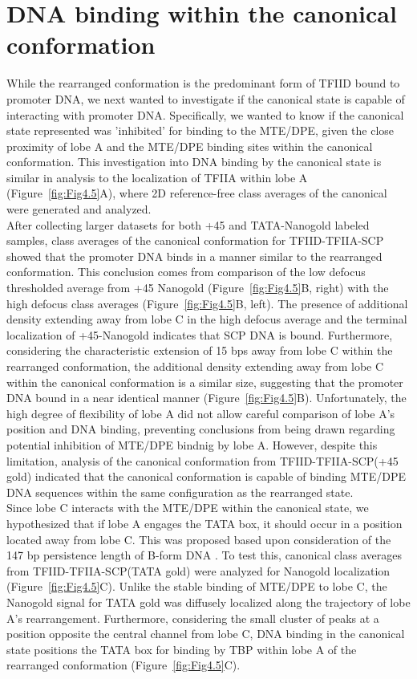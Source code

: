 \section{DNA binding within the canonical conformation}

While the rearranged conformation is the predominant form of TFIID bound to promoter DNA, we next wanted to investigate if the canonical state is capable of interacting with promoter DNA. Specifically, we wanted to know if the canonical state represented was 'inhibited' for binding to the MTE/DPE, given the close proximity of lobe A and the MTE/DPE binding sites within the canonical conformation. This investigation into DNA binding by the canonical state is similar in analysis to the localization of TFIIA within lobe A (Figure~\ref{fig:Fig4.5}A), where 2D reference-free class averages of the canonical were generated and analyzed. \\
\indent After collecting larger datasets for both +45 and TATA-Nanogold labeled samples, class averages of the canonical conformation for TFIID-TFIIA-SCP showed that the promoter DNA binds in a manner similar to the rearranged conformation. This conclusion comes from comparison of the low defocus thresholded average from +45 Nanogold (Figure~\ref{fig:Fig4.5}B, right) with the high defocus class averages (Figure~\ref{fig:Fig4.5}B, left). The presence of additional density extending away from lobe C in the high defocus average and the terminal localization of +45-Nanogold indicates that SCP DNA is bound. Furthermore, considering the characteristic extension of 15 bps away from lobe C within the rearranged conformation, the additional density extending away from lobe C within the canonical conformation is a similar size, suggesting that the promoter DNA bound in a near identical manner (Figure~\ref{fig:Fig4.5}B). Unfortunately, the high degree of flexibility of lobe A did not allow careful comparison of lobe A's position and DNA binding, preventing conclusions from being drawn regarding potential inhibition of MTE/DPE bindnig by lobe A. However, despite this limitation, analysis of the canonical conformation from TFIID-TFIIA-SCP(+45 gold) indicated that the canonical conformation is capable of binding MTE/DPE DNA sequences within the same configuration as the rearranged state.\\
\indent Since lobe C interacts with the MTE/DPE within the canonical state, we hypothesized that if lobe A engages the TATA box, it should occur in a position located away from lobe C. This was proposed based upon consideration of the 147 bp persistence length of B-form DNA \cite{Bustamante_2000}. To test this, canonical class averages from TFIID-TFIIA-SCP(TATA gold) were analyzed for Nanogold localization (Figure~\ref{fig:Fig4.5}C). Unlike the stable binding of MTE/DPE to lobe C, the Nanogold signal for TATA gold was diffusely localized along the trajectory of lobe A's rearrangement. Furthermore, considering the small cluster of peaks at a position opposite the central channel from lobe C, DNA binding in the canonical state positions the TATA box for binding by TBP within lobe A of the rearranged conformation (Figure~\ref{fig:Fig4.5}C). \\
